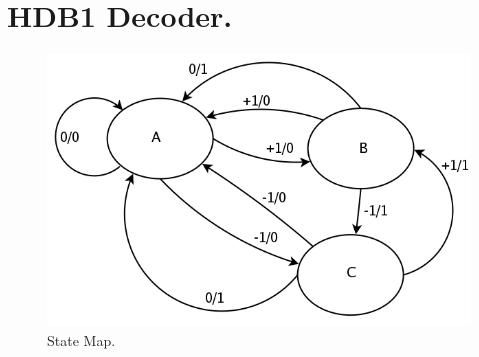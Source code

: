 \documentclass[11pt]{article}
\begin{document}
\vspace{10pt}

\section{HDB1 Decoder. }

\begin{figure}[H]
\centering
\includegraphics[scale=0.2665]{estados-hdb1_dec}
\caption[ ]{\label{estados-hdb1_dec} State Map. }
\end{figure}
\end{document}
